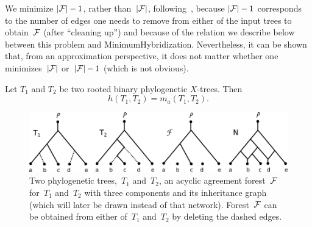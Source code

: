We minimize $|{\mathcal F}|-1$, rather than~$|{\mathcal F}|$, following~\cite{bordewich07a}, because $|{\mathcal F}|-1$ corresponds to the number of edges one needs to remove from either of the input trees to obtain~${\mathcal F}$ (after ``cleaning up'') and because of the relation we describe below between this problem and {\sc MinimumHybridization}. Nevertheless, it can be shown that, from an approximation perspective, it does not matter whether one minimizes~$|{\mathcal F}|$ or~$|{\mathcal F}|-1$ (which is not obvious).

\begin{theorem}{\cite[Theorem 2]{baroni05}}\label{t:hybrid}
Let $T_1$ and $T_2$ be two rooted binary phylogenetic $X$-trees. Then
$$h(T_1,T_2)=m_a(T_1,T_2).$$
\end{theorem}


\begin{figure}
    \centering
     \includegraphics[scale=.5]{../figs/ch1/intromaaf.png}
    \caption{Two phylogenetic trees,~$T_1$ and~$T_2$, an acyclic agreement forest~${\mathcal F}$ for~$T_1$ and~$T_2$ with three components and its inheritance graph (which will later be drawn instead of that network). Forest~${\mathcal F}$ can be obtained from either of~$T_1$ and~$T_2$ by deleting the dashed edges.} 
    \label{fig:intromaaf}
\end{figure}


